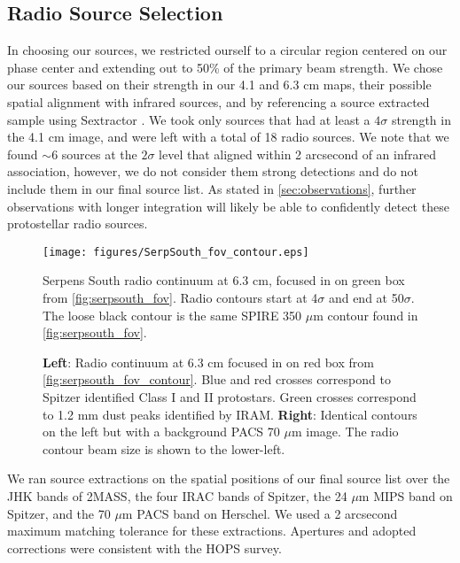 \documentclass[apj]{emulateapj}
\begin{document}
\subsection{Radio Source Selection}
\label{sec:radio source selection}

In choosing our sources, we restricted ourself to a circular region centered on our phase center and extending out to 50\% of the primary beam strength. We chose our sources based on their strength in our 4.1 and 6.3 cm maps, their possible spatial alignment with infrared sources, and by referencing a source extracted sample using Sextractor \citep{Bertin96}. We took only sources that had at least a $4\sigma$ strength in the 4.1 cm image, and were left with a total of 18 radio sources. We note that we found $\sim$6 sources at the $2\sigma$ level that aligned within 2 arcsecond of an infrared association, however, we do not consider them strong detections and do not include them in our final source list. As stated in \autoref{sec:observations}, further observations with longer integration will likely be able to confidently detect these protostellar radio sources.

\begin{figure}[h!]
\label{fig:serpsouth_fov_contour}
\centering
\texttt{[image: figures/SerpSouth\_fov\_contour.eps]}
\caption{\small{Serpens South radio continuum at 6.3 cm, focused in on green box from \autoref{fig:serpsouth_fov}. Radio contours start at 4$\sigma$ and end at 50$\sigma$. The loose black contour is the same SPIRE 350 $\mu$m contour found in \autoref{fig:serpsouth_fov}. 
}}
\end{figure}

\begin{figure*}
\label{fig:zoom}

\caption{{\bfseries Left}: Radio continuum at 6.3 cm focused in on red box from \autoref{fig:serpsouth_fov_contour}. Blue and red crosses correspond to Spitzer identified Class I and II protostars. Green crosses correspond to 1.2 mm dust peaks identified by IRAM. {\bfseries Right}: Identical contours on the left but with a background PACS 70 $\mu$m image. The radio contour beam size is shown to the lower-left.}
\end{figure*}

We ran source extractions on the spatial positions of our final source list over the JHK bands of 2MASS, the four IRAC bands of Spitzer, the 24 $\mu$m MIPS band on Spitzer, and the 70 $\mu$m PACS band on Herschel. We used a 2 arcsecond maximum matching tolerance for these extractions. Apertures and adopted corrections were consistent with the HOPS survey. 
\end{document}
